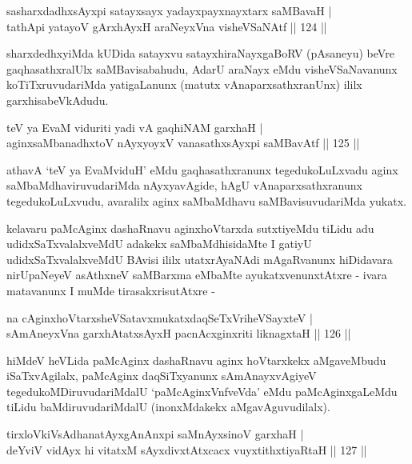 \begin{shl}
sasharxdadhxsAyxpi satayxsayx yadayxpayxnayxtarx saMBavaH | \\
tathA\s pi yatayoV gArxhAyxH araNeyxVna visheVSaNAtf \hfill|| 124 || 
\end{shl}

\begin{artha}
sharxdedhxyiMda kUDida satayxvu satayxhiraNayxgaBoRV (pAsaneyu) beVre
gaqhasathxralUlx saMBavisabahudu, AdarU araNayx eMdu visheVSaNavanunx
koTiTxruvudariMda yatigaLanunx (matutx vAnaparxsathxranUnx) ililx
garxhisabeVkAdudu.
\end{artha}


\begin{shl}
teV ya EvaM viduriti yadi vA gaqhiNAM garxhaH | \\
aginxsaMbanadhxtoV nAyxyoyxV vanasathxsAyxpi saMBavAtf \hfill|| 125 || 
\end{shl}

\begin{artha}
athavA `teV ya EvaMviduH' eMdu gaqhasathxranunx tegedukoLuLxvadu aginx
saMbaMdhaviruvudariMda nAyxyavAgide, hAgU vAnaparxsathxranunx
tegedukoLuLxvudu, avaralilx aginx saMbaMdhavu saMBavisuvudariMda
yukatx.
\end{artha}

\begin{artha}
kelavaru paMcAginx dashaRnavu aginxhoVtarxda sutxtiyeMdu tiLidu adu
udidxSaTxvalalxveMdU adakekx saMbaMdhisidaMte I gatiyU
udidxSaTxvalalxveMdU BAvisi ililx utatxrAyaNAdi mAgaRvanunx hiDidavara
nirUpaNeyeV asAthxneV saMBarxma eMbaMte ayukatxvenunxtAtxre - ivara
matavanunx I muMde tirasakxrisutAtxre -
\end{artha}

\begin{shl}
na cAginxhoVtarxsheVSatavxmukatxdaqSeTxVriheVSayxteV | \\
sAmAneyxVna garxhAtatxsAyxH pacnAcxginxriti liknagxtaH \hfill|| 126 || 
\end{shl}

\begin{artha}
hiMdeV heVLida paMcAginx dashaRnavu aginx hoVtarxkekx aMgaveMbudu
iSaTxvAgilalx, paMcAginx daqSiTxyanunx sAmAnayxvAgiyeV
tegedukoMDiruvudariMdalU `paMcAginxVnfveVda' eMdu paMcAginxgaLeMdu
tiLidu baMdiruvudariMdalU (inonxMdakekx aMgavAguvudilalx).
\end{artha}

\begin{shl}
tirxloVkiVsAdhanatAyxgAnAnxpi saMnAyxsinoV garxhaH | \\
deYviV vidAyx hi vitatxM sAyxdivxtAtxcacx vuyxtithxtiyaRtaH \hfill|| 127 || 
\end{shl}


